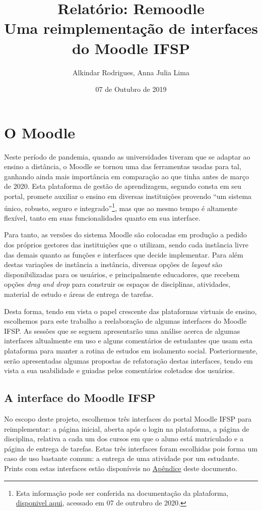 \documentclass[11pt]{article}
\author{Alkindar Rodrigues, Anna Julia Lima}
\date{07 de Outubro de 2019}
\title{Relatório: Remoodle\\\medskip
\large Uma reimplementação de interfaces do Moodle IFSP}
\begin{document}
\maketitle

\section*{O Moodle}
\label{sec:orgfde736f}
Neste período de pandemia, quando as universidades tiveram que se
adaptar ao ensino a distância, o Moodle se tornou uma das ferramentas
usadas para tal, ganhando ainda mais importância em comparação ao que
tinha antes de março de 2020.
Esta plataforma de gestão de aprendizagem, segundo consta em seu
portal, promete auxiliar o ensino em diversas instituições provendo
``um sistema único, robusto, seguro e integrado''\footnote{Esta informação pode ser conferida na documentação da
plataforma, \href{https://docs.moodle.org/39/en/About\_Moodle\#Highly\_flexible\_and\_fully\_customisable}{disponivel aqui}, acessado em 07 de outrubro de 2020.}, mas que ao mesmo
tempo é altamente flexível, tanto em suas funcionalidades quanto em
sua interface.

Para tanto, as versões do sistema Moodle são colocadas em produção
a pedido dos próprios gestores das instituições que o utilizam, sendo
cada instância livre das demais quanto as funções e interfaces
que decide implementar.
Para além destas variações de instância a instância, diversas opções
de \emph{layout} são disponibilizadas para os usuários, e principalmente
educadores, que recebem opções \emph{drag and drop} para construir os
espaços de disciplinas, atividades, material de estudo e áreas de
entrega de tarefas.

Desta forma, tendo em vista o papel crescente das plataformas virtuais
de ensino, escolhemos para este trabalho a reelaboração de algumas
interfaces do Moodle IFSP.
As sessões que se seguem apresentarão uma análise acerca de algumas
interfaces altualmente em uso e alguns comentários de estudantes que
usam esta plataforma para manter a rotina de estudos em isolamento
social.
Posteriormente, serão apresentadas algumas propostas de refatoração
destas interfaces, tendo em vista a sua usabilidade e guiadas pelos
comentários coletados dos usuários.

\subsection*{A interface do Moodle IFSP}
\label{sec:org544adae}
No escopo deste projeto, escolhemos três interfaces do portal Moodle
IFSP para reimplementar: a página inicial, aberta após o login na
plataforma, a página de disciplina, relativa a cada um dos cursos em
que o aluno está matriculado e a página de entrega de tarefas.  Estas
três interfaces foram escolhidas pois forma um caso de uso bastante
comum: a entrega de uma atividade por um estudante. Prints com estas
interfaces estão disponíveis no \hyperref[sec:orgbcb1147]{Apêndice} deste documento.
\end{document}
